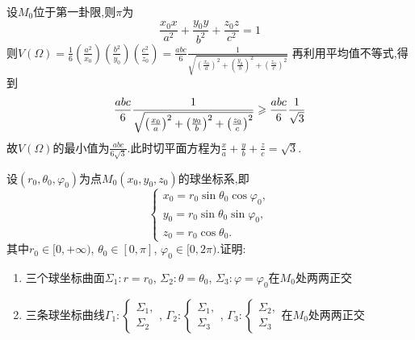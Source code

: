 \begin{solution}
    设$M_0$位于第一卦限,则$\pi$为$$\frac{x_0x}{a^2} + \frac{y_0y}{b^2} + \frac{z_0z}{c^2} = 1$$
    则$V(\Omega) = \frac16 \left( \frac{a^2}{x_0} \right) \left( \frac{b^2}{y_0} \right) \left( \frac{c^2}{z_0} \right) = \frac{abc}{6} \frac{1}{\sqrt{\left(\frac{x_0}{a}\right)^2 + \left(\frac{y_0}{b}\right)^2 + \left(\frac{z_0}{c}\right)^2}}$
    再利用平均值不等式,得到
    $$\frac{abc}{6} \frac{1}{\sqrt{\left(\frac{x_0}{a}\right)^2 + \left(\frac{y_0}{b}\right)^2 + \left(\frac{z_0}{c}\right)^2}} \geqslant \frac{abc}{6} \frac{1}{\sqrt{3}}$$
    故$V(\Omega)$的最小值为$\frac{abc}{6\sqrt{3}}$.此时切平面方程为$\frac{x}{a} + \frac{y}{b} + \frac{z}{c} = \sqrt{3}$.
\end{solution}


\begin{example}
    设$(r_0,\theta_0,\varphi_0)$为点$M_0(x_0,y_0,z_0)$的球坐标系,即
    $$\begin{cases}
        x_0 = r_0 \sin \theta_0 \cos \varphi_0,\\
        y_0 = r_0 \sin \theta_0 \sin \varphi_0,\\
        z_0 = r_0 \cos \theta_0.
    \end{cases}$$
    其中$r_0 \in [0,+\infty)$, $\theta_0 \in [0,\pi]$, $\varphi_0 \in [0,2\pi)$.证明:
    \begin{enumerate}
        \item 三个球坐标曲面$\Sigma_1: r = r_0$, $\Sigma_2: \theta = \theta_0$, $\Sigma_3: \varphi = \varphi_0$在$M_0$处两两正交
        \item 三条球坐标曲线$\Gamma_1: \begin{cases}
            \Sigma_1,\\
            \Sigma_2
        \end{cases}$, $\Gamma_2: \begin{cases}
            \Sigma_1,\\
            \Sigma_3
        \end{cases}$, $\Gamma_3: \begin{cases}
            \Sigma_2,\\
            \Sigma_3
        \end{cases}$在$M_0$处两两正交
    \end{enumerate}
\end{example}

